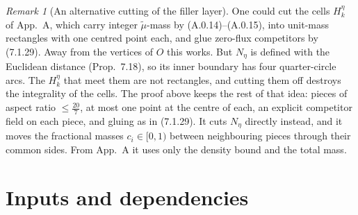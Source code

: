 \documentclass[11pt]{article}
\theoremstyle{definition}
\theoremstyle{remark}
\newtheorem{remark}[theorem]{Remark}
\begin{document}
\begin{remark}[An alternative cutting of the filler layer]\label{rem:filler-route}
One could cut the cells $H_k^\eta$ of App.~A, which carry integer
$\tilde\mu$-mass by (A.0.14)--(A.0.15), into unit-mass rectangles with one centred point each, and glue
zero-flux competitors by (7.1.29). Away from the vertices of $O$ this works. But $N_\eta$ is
defined with the Euclidean distance (Prop.~7.18), so its inner boundary has four
quarter-circle arcs. The $H_k^\eta$ that meet them are not rectangles, and cutting them off
destroys the integrality of the cells. The proof above keeps the rest of that idea: pieces of
aspect ratio $\le\tfrac{20}7$, at most one point at the centre of each, an explicit competitor field
on each piece, and gluing as in (7.1.29). It cuts $N_\eta$ directly instead, and it moves the
fractional masses $c_i\in[0,1)$ between neighbouring pieces through their common sides. From
App.~A it uses only the density bound and the total mass.
\end{remark}

\section{Inputs and dependencies}\label{sec:gaps}
\end{document}
